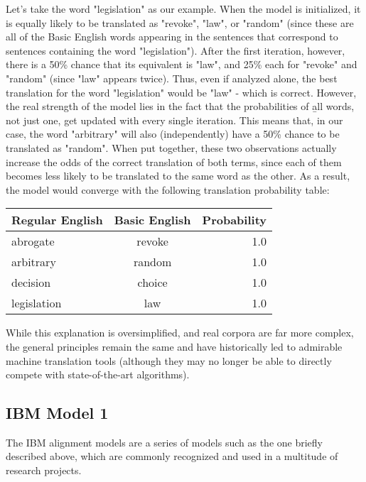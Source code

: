 \documentclass[11pt]{article}
\begin{document}
Let's take the word "legislation" as our example. When the model is initialized, it is equally likely to be translated as "revoke", "law", or "random" (since these are all of the Basic English words appearing in the sentences that correspond to sentences containing the word "legislation"). After the first iteration, however, there is a 50\% chance that its equivalent is "law", and 25\% each for "revoke" and "random" (since "law" appears twice). Thus, even if analyzed alone, the best translation for the word "legislation" would be "law" - which is correct. However, the real strength of the model lies in the fact that the probabilities of {\b all} words, not just one, get updated with every single iteration. This means that, in our case, the word "arbitrary" will also (independently) have a 50\% chance to be translated as "random". When put together, these two observations actually increase the odds of the correct translation of both terms, since each of them becomes less likely to be translated to the same word as the other. As a result, the model would converge with the following translation probability table:


\begin{center}
  \begin{tabular}{ | l | c | r |}
    \hline
	Regular English & Basic English & Probability \\ \hline
    abrogate & revoke & 1.0 \\ \hline
    arbitrary & random & 1.0 \\ \hline
    decision & choice & 1.0 \\ \hline
	legislation & law & 1.0 \\   
	\hline
  \end{tabular}
\end{center}


While this explanation is oversimplified, and real corpora are far more complex, the general principles remain the same and have historically led to admirable machine translation tools (although they may no longer be able to directly compete with state-of-the-art algorithms).

\subsection{IBM Model 1}

The IBM alignment models are a series of models such as the one briefly described above, which are commonly recognized and used in a multitude of research projects.
\end{document}

